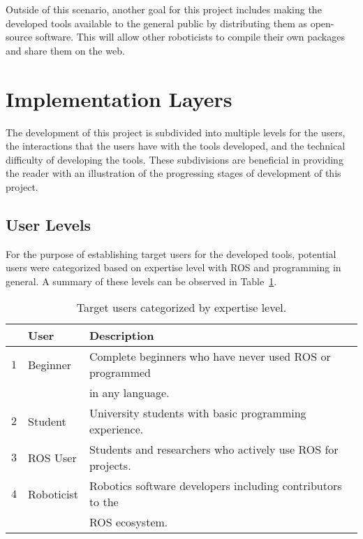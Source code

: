     Outside of this scenario, another goal for this project includes making the 
    developed tools available to the general public by distributing them as
    open-source software. This will allow other roboticists to compile their own
    packages and share them on the web.


\section{Implementation Layers}

    The development of this project is subdivided into multiple levels for the 
    users, the interactions that the users have with the tools developed, and
    the technical difficulty of developing the tools. These subdivisions are
    beneficial in providing the reader with an illustration of the progressing 
    stages of development of this project.


    \subsection{User Levels}

        For the purpose of establishing target users for the developed tools,
        potential users were categorized based on expertise level with \ac{ROS} 
        and programming in general. A summary of these levels can be  observed 
        in Table~\ref{tab:userlevels}.

        \begin{table}[htbp]
            \color{textColor}
            \centering	
            \caption{Target users categorized by expertise level.}
                \begin{tabular}{rll}
                    \toprule
                    & \textbf{User}   & \textbf{Description} \\
                    \midrule
                    $1$ & Beginner    & Complete beginners who have never used ROS or programmed \\
                    & & in any language. \\[0.5em]

                    $2$ & Student     & University students with basic programming experience. \\[0.5em]

                    $3$ & ROS User    & Students and researchers who actively use ROS for projects. \\[0.5em]

                    $4$ &  Roboticist & Robotics software developers including contributors to the \\
                    & & ROS ecosystem. \\
                \bottomrule
            \end{tabular}\label{tab:userlevels}
        \end{table}

